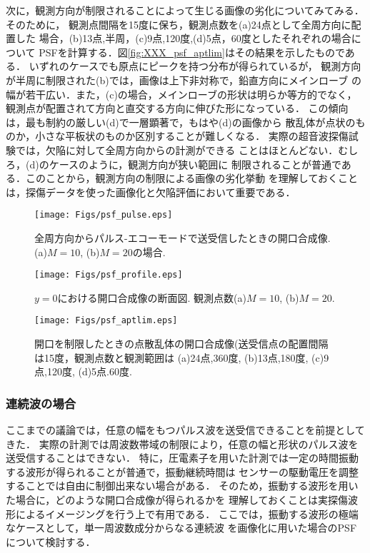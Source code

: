 次に，観測方向が制限されることによって生じる画像の劣化についてみてみる．
そのために， 観測点間隔を15度に保ち，観測点数を(a)24点として全周方向に配置した
場合，(b)13点,半周，(c)9点,120度,(d)5点，60度としたそれぞれの場合について
PSFを計算する．図\ref{fig:XXX_psf_aptlim}はその結果を示したものである．
いずれのケースでも原点にピークを持つ分布が得られているが，
観測方向が半周に制限された(b)では，画像は上下非対称で，鉛直方向にメインローブ
の幅が若干広い．また，(c)の場合，メインローブの形状は明らか等方的でなく，
観測点が配置されて方向と直交する方向に伸びた形になっている．
この傾向は，最も制約の厳しい(d)で一層顕著で，もはや(d)の画像から
散乱体が点状のものか，小さな平板状のものか区別することが難しくなる．
実際の超音波探傷試験では，欠陥に対して全周方向からの計測ができる
ことはほとんどない．むしろ，(d)のケースのように，観測方向が狭い範囲に
制限されることが普通である．このことから，観測方向の制限による画像の劣化挙動
を理解しておくことは，探傷データを使った画像化と欠陥評価において重要である．
\begin{figure}[h]
	\begin{center}
	\texttt{[image: Figs/psf\_pulse.eps]} 
	\end{center}
	\caption{全周方向からパルス-エコーモードで送受信したときの開口合成像.(a)$M=10$, (b)$M=20$の場合.} 
	\label{fig:XXX_psf_pulse}
\end{figure}
\begin{figure}[h]
	\begin{center}
	\texttt{[image: Figs/psf\_profile.eps]} 
	\end{center}
	\caption{$y=0$における開口合成像の断面図. 観測点数(a)$M=10$, (b)$M=20$.}
	\label{fig:XXX_psf_profile} 
\end{figure}
\begin{figure}[h]
	\begin{center}
	\texttt{[image: Figs/psf\_aptlim.eps]} 
	\end{center}
	\caption{開口を制限したときの点散乱体の開口合成像(送受信点の配置間隔は15度，観測点数と観測範囲は
	(a)24点,360度, (b)13点,180度, (c)9点,120度, (d)5点.60度.} 
	\label{fig:XXX_100}
\end{figure}
\subsubsection{連続波の場合}
ここまでの議論では，任意の幅をもつパルス波を送受信できることを前提としてきた．
実際の計測では周波数帯域の制限により，任意の幅と形状のパルス波を送受信することはできない．
特に，圧電素子を用いた計測では一定の時間振動する波形が得られることが普通で，振動継続時間は
センサーの駆動電圧を調整することでは自由に制御出来ない場合がある．
そのため，振動する波形を用いた場合に，どのような開口合成像が得られるかを
理解しておくことは実探傷波形によるイメージングを行う上で有用である．
ここでは，振動する波形の極端なケースとして，単一周波数成分からなる連続波
を画像化に用いた場合のPSFについて検討する．

